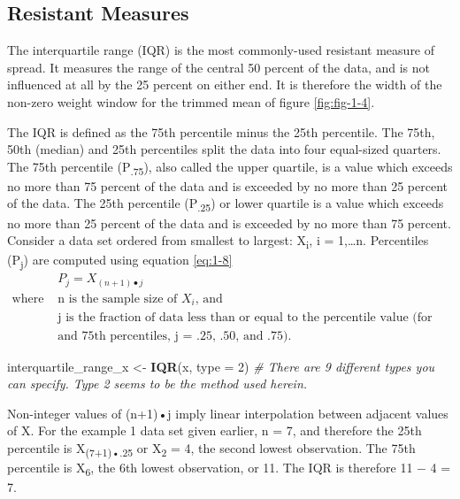 \documentclass[]{book}
\newenvironment{Shaded}{\begin{snugshade}}{\end{snugshade}}
\newcommand{\CommentTok}[1]{\textcolor[rgb]{0.56,0.35,0.01}{\textit{#1}}}
\newcommand{\DataTypeTok}[1]{\textcolor[rgb]{0.13,0.29,0.53}{#1}}
\newcommand{\DecValTok}[1]{\textcolor[rgb]{0.00,0.00,0.81}{#1}}
\newcommand{\KeywordTok}[1]{\textcolor[rgb]{0.13,0.29,0.53}{\textbf{#1}}}
\newcommand{\NormalTok}[1]{#1}
\newcommand{\StringTok}[1]{\textcolor[rgb]{0.31,0.60,0.02}{#1}}
\begin{document}
\hypertarget{resistant-measures}{%
\subsection{Resistant Measures}\label{resistant-measures}}

The interquartile range (IQR) is the most commonly-used resistant measure of spread. It measures the range of the central 50 percent of the data, and is not influenced at all by the 25 percent on either end. It is therefore the width of the non-zero weight window for the trimmed mean of figure \ref{fig:fig-1-4}.

The IQR is defined as the 75th percentile minus the 25th percentile. The 75th, 50th (median) and 25th percentiles split the data into four equal-sized quarters. The 75th percentile (P\textsubscript{.75}), also called the upper quartile, is a value which exceeds no more than 75 percent of the data and is exceeded by no more than 25 percent of the data. The 25th percentile (P\textsubscript{.25}) or lower quartile is a value which exceeds no more than 25 percent of the data and is exceeded by no more than 75 percent. Consider a data set ordered from smallest to largest: X\textsubscript{i}, i = 1,\ldots{}n. Percentiles (P\textsubscript{j}) are computed using equation \eqref{eq:1-8}
\begin{equation}
\begin{aligned}
& P_{j} = X_{(n + 1) \bullet j} \\
\text{where } & \text{n is the sample size of $X_{i}$, and} \\
& \text{j is the fraction of data less than or equal to the percentile value (for the 25th, 50th}\\
& \text{and 75th percentiles, j = .25, .50, and .75).}
\end {aligned}
\label{eq:1-8}
\end{equation}

\begin{Shaded}
\begin{Highlighting}[]
\NormalTok{interquartile_range_x <-}\StringTok{ }\KeywordTok{IQR}\NormalTok{(x, }\DataTypeTok{type =} \DecValTok{2}\NormalTok{)}
\CommentTok{# There are 9 different types you can specify. Type 2 seems to be the method used herein.}
\end{Highlighting}
\end{Shaded}

Non-integer values of (n+1)•j imply linear interpolation between adjacent values of X. For the example 1 data set given earlier, n = 7, and therefore the 25th percentile is X\textsubscript{(7+1)•.25} or X\textsubscript{2} = 4, the second lowest observation. The 75th percentile is X\textsubscript{6}, the 6th lowest observation, or 11. The IQR is therefore 11 − 4 = 7.
\end{document}
